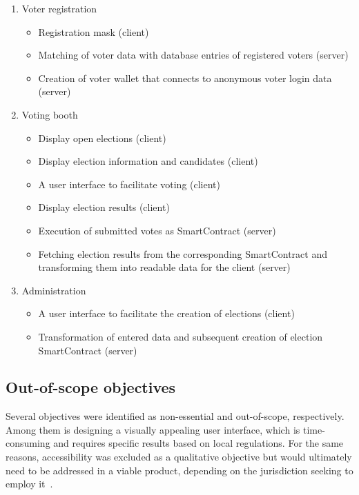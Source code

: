 \begin{enumerate}
    \item Voter registration
    \begin{itemize}
        \item Registration mask (client)
        \item Matching of voter data with database entries of registered voters (server)
        \item Creation of voter wallet that connects to anonymous voter login data (server)
    \end{itemize}
    \item Voting booth
    \begin{itemize}
        \item Display open elections (client)
        \item Display election information and candidates (client)
        \item A user interface to facilitate voting (client)
        \item Display election results (client)
        \item Execution of submitted votes as \gls{SmartContract} (server)
        \item Fetching election results from the corresponding \gls{SmartContract} and transforming them into readable data for the client (server)
    \end{itemize}
    \item Administration
    \begin{itemize}
        \item A user interface to facilitate the creation of elections (client)
        \item Transformation of entered data and subsequent creation of election \gls{SmartContract} (server)
    \end{itemize}
\end{enumerate}

\subsection{Out-of-scope objectives}\label{subsec:out-of-scope-objectives}

Several objectives were identified as non-essential and out-of-scope, respectively.
Among them is designing a visually appealing user interface, which is time-consuming and requires specific results based on local regulations.
For the same reasons, accessibility was excluded as a qualitative objective but would ultimately need to be addressed in a viable product, depending on the jurisdiction seeking to employ it~\autocites{laskowski_promoting_2022}[sections 2.2, 2.7]{lowry_desirable_2009}.

